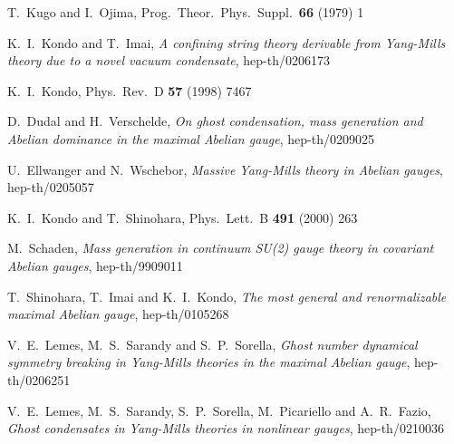 \documentclass[a4paper,12pt]{article}
\begin{document}
\begin{thebibliography}{99}
  T.~Kugo and I.~Ojima, Prog.\ Theor.\ Phys.\ Suppl.\
\textbf{66} (1979) 1

  K.~I.~Kondo and T.~Imai, \emph{A confining string theory derivable from Yang-Mills theory due to a  novel vacuum condensate}, hep-th/0206173

  K.~I.~Kondo, Phys.\ Rev.\ D \textbf{57} (1998) 7467

  D.~Dudal and H.~Verschelde, \emph{On ghost condensation, mass generation
 and Abelian dominance in the  maximal Abelian gauge}, hep-th/0209025

U.~Ellwanger and N.~Wschebor, \emph{Massive Yang-Mills theory in
Abelian gauges}, hep-th/0205057

  K.~I.~Kondo and T.~Shinohara, Phys.\ Lett.\ B
\textbf{491} (2000) 263

  M.~Schaden, \emph{Mass generation in continuum SU(2) gauge theory in
covariant Abelian  gauges}, hep-th/9909011

  T.~Shinohara, T.~Imai and K.~I.~Kondo,
\emph{The most general and renormalizable maximal Abelian gauge},
hep-th/0105268

V.~E.~Lemes, M.~S.~Sarandy and S.~P.~Sorella, \emph{Ghost number
dynamical symmetry breaking in Yang-Mills theories in the maximal
Abelian gauge}, hep-th/0206251

V.~E.~Lemes, M.~S.~Sarandy, S.~P.~Sorella, M.~Picariello and
A.~R.~Fazio, \emph{Ghost condensates in Yang-Mills theories in
nonlinear gauges}, hep-th/0210036

\end{thebibliography}
\end{document}
